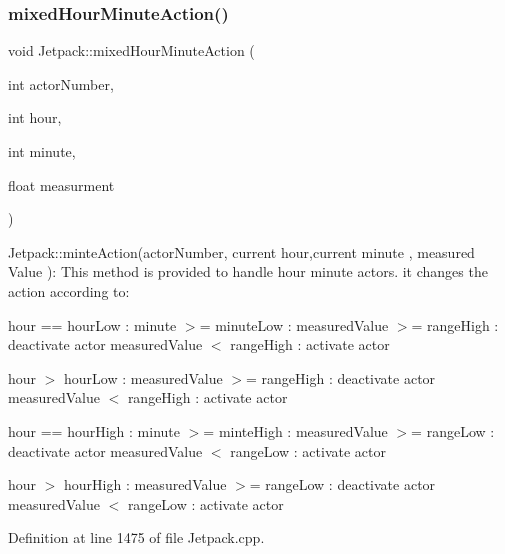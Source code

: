 \subsubsection{\texorpdfstring{mixed\+Hour\+Minute\+Action()}{mixedHourMinuteAction()}}
{\footnotesize\ttfamily void Jetpack\+::mixed\+Hour\+Minute\+Action (\begin{DoxyParamCaption}\item[{int}]{actor\+Number,  }\item[{int}]{hour,  }\item[{int}]{minute,  }\item[{float}]{measurment }\end{DoxyParamCaption})}

Jetpack\+::minte\+Action(actor\+Number, current hour,current minute , measured Value )\+: This method is provided to handle hour minute actors. it changes the action according to\+:

hour == hour\+Low \+: minute $>$= minute\+Low \+: measured\+Value $>$= range\+High \+: deactivate actor measured\+Value $<$ range\+High \+: activate actor

hour $>$ hour\+Low \+: measured\+Value $>$= range\+High \+: deactivate actor measured\+Value $<$ range\+High \+: activate actor

hour == hour\+High \+: minute $>$= minte\+High \+: measured\+Value $>$= range\+Low \+: deactivate actor measured\+Value $<$ range\+Low \+: activate actor

hour $>$ hour\+High \+: measured\+Value $>$= range\+Low \+: deactivate actor measured\+Value $<$ range\+Low \+: activate actor 

Definition at line 1475 of file Jetpack.\+cpp.


